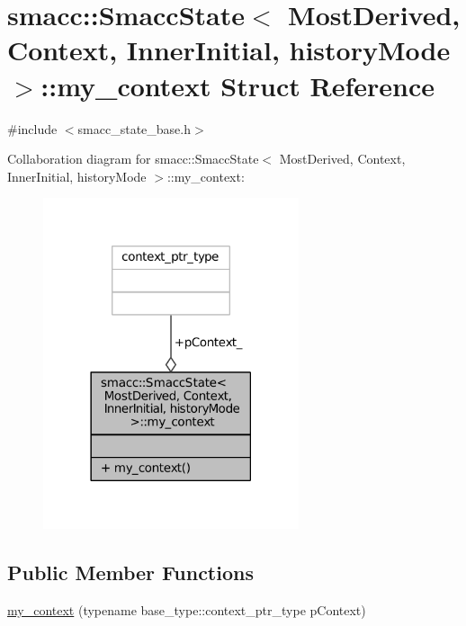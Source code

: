 \hypertarget{structsmacc_1_1SmaccState_1_1my__context}{}\section{smacc\+:\+:Smacc\+State$<$ Most\+Derived, Context, Inner\+Initial, history\+Mode $>$\+:\+:my\+\_\+context Struct Reference}
\label{structsmacc_1_1SmaccState_1_1my__context}


{\ttfamily \#include $<$smacc\+\_\+state\+\_\+base.\+h$>$}



Collaboration diagram for smacc\+:\+:Smacc\+State$<$ Most\+Derived, Context, Inner\+Initial, history\+Mode $>$\+:\+:my\+\_\+context\+:
\nopagebreak
\begin{figure}[H]
\begin{center}
\leavevmode
\includegraphics[width=213pt]{structsmacc_1_1SmaccState_1_1my__context__coll__graph}
\end{center}
\end{figure}
\subsection*{Public Member Functions}
\begin{DoxyCompactItemize}
\item 
\hyperlink{structsmacc_1_1SmaccState_1_1my__context_af9c11c27b17bbf7de0d4e21c87d49f6f}{my\+\_\+context} (typename base\+\_\+type\+::context\+\_\+ptr\+\_\+type p\+Context)
\end{DoxyCompactItemize}
